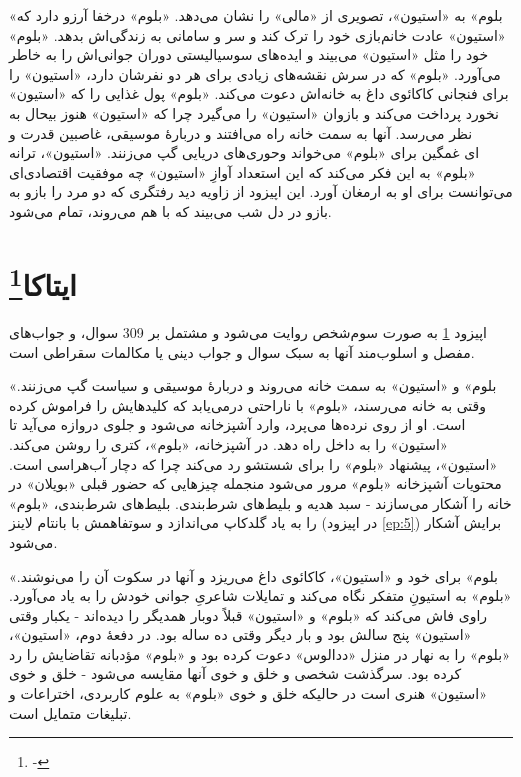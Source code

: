 \documentclass[12pt]{book}
\newcommand{\noun}[1]{«{#1}»}
\begin{document}
    \noun{بلوم} به \noun{استیون}، تصویری از \noun{مالی} را نشان می‌دهد. \noun{بلوم} درخفا آرزو دارد که \noun{استیون} عادت خانم‌بازی خود را ترک کند و سر و سامانی به زندگی‌اش بدهد. \noun{بلوم} خود را مثل \noun{استیون} می‌بیند و ایده‌های سوسیالیستی دوران جوانی‌اش را به خاطر می‌آورد. \noun{بلوم} که در سرش نقشه‌های زیادی برای هر دو نفرشان دارد، \noun{استیون} را برای فنجانی کاکائوی داغ به خانه‌اش دعوت می‌کند. \noun{بلوم} پول غذایی را که \noun{استیون} نخورد پرداخت می‌کند و بازوان \noun{استیون} را می‌گیرد چرا که \noun{استیون} هنوز بیحال به نظر می‌رسد. آنها به سمت خانه راه می‌افتند و دربارۀ موسیقی، غاصبین قدرت و حوری‌های دریایی گپ می‌زنند. \noun{استیون}، ترانه‎‌ای غمگین برای \noun{بلوم} می‌خواند و \noun{بلوم} به این فکر می‌کند که این استعداد آوازِ \noun{استیون} چه موفقیت اقتصادی‌ای می‌توانست برای او به ارمغان آورد. این اپیزود از زاویه دید رفتگری که دو مرد را بازو به بازو در دل شب می‌بیند که با هم می‌روند، تمام می‌شود.

    \chapter[ایتاکا]{ایتاکا\protect\footnote{-}}\label{ep:17}
    اپیزود \ref{ep:17} به صورت سوم‌شخص روایت می‌شود و مشتمل بر 309 سوال، و جواب‌های مفصل و اسلوب‌مند آنها به سبک سوال و جواب دینی یا مکالمات سقراطی است.

    \noun{بلوم} و \noun{استیون} به سمت خانه می‌روند و دربارۀ موسیقی و سیاست گپ می‌زنند. وقتی به خانه می‌رسند، \noun{بلوم} با ناراحتی درمی‌یابد که کلیدهایش را فراموش کرده است. او از روی نرده‌ها می‌پرد، وارد آشپزخانه می‌شود و جلوی دروازه می‌آید تا \noun{استیون} را به داخل راه دهد. در آشپزخانه، \noun{بلوم}، کتری را روشن می‌کند. \noun{استیون}، پیشنهاد \noun{بلوم} را برای شستشو رد می‌کند چرا که دچار آب‌هراسی است. محتویات آشپزخانه \noun{بلوم} مرور می‌شود منجمله چیزهایی که حضور قبلی \noun{بویلان} در خانه را آشکار می‌سازند - سبد هدیه و بلیط‌های شرط‌بندی. بلیط‌های شرط‌بندی، \noun{بلوم} را به یاد گلدکاپ می‌اندازد و سوتفاهمش با بانتام لاینز (در اپیزود \ref{ep:5}) برایش آشکار می‌شود.

    \noun{بلوم} برای خود و \noun{استیون}، کاکائوی داغ می‌ریزد و آنها در سکوت آن را می‌نوشند. \noun{بلوم} به استیونِ متفکر نگاه می‌کند و تمایلات شاعریِ جوانی خودش را به یاد می‌آورد. راوی فاش می‌کند که \noun{بلوم} و \noun{استیون} قبلاً دوبار همدیگر را دیده‌اند - یکبار وقتی \noun{استیون} پنج سالش بود و بار دیگر وقتی ده ساله بود. در دفعۀ دوم، \noun{استیون}، \noun{بلوم} را به نهار در منزل \noun{ددالوس} دعوت کرده بود و \noun{بلوم} مؤدبانه تقاضایش را رد کرده بود. سرگذشت شخصی و خلق و خوی آنها مقایسه می‌شود - خلق و خوی \noun{استیون} هنری است در حالیکه خلق و خوی \noun{بلوم} به علوم کاربردی، اختراعات و تبلیغات متمایل است.
\end{document}
